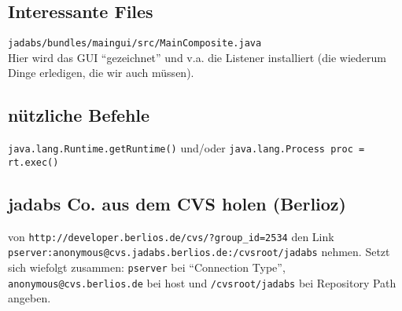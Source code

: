 \documentclass[10pt]{article}
\begin{document}
\subsection{Interessante Files}
\texttt{jadabs/bundles/maingui/src/MainComposite.java}\\
Hier wird das GUI ``gezeichnet'' und v.a. die Listener installiert (die wiederum Dinge erledigen, die wir auch m\"ussen).

\subsection{n\"utzliche Befehle}
\texttt{java.lang.Runtime.getRuntime()} und/oder \texttt{java.lang.Process proc = rt.exec()}

\subsection{jadabs Co. aus dem CVS holen (Berlioz)}
von \texttt{http://developer.berlios.de/cvs/?group\_id=2534} den Link\\ \texttt{pserver:anonymous@cvs.jadabs.berlios.de:/cvsroot/jadabs} nehmen.
Setzt sich wiefolgt zusammen: \texttt{pserver} bei ``Connection Type'', \texttt{anonymous@cvs.berlios.de} bei host und \texttt{/cvsroot/jadabs} bei Repository Path angeben.
\end{document}
